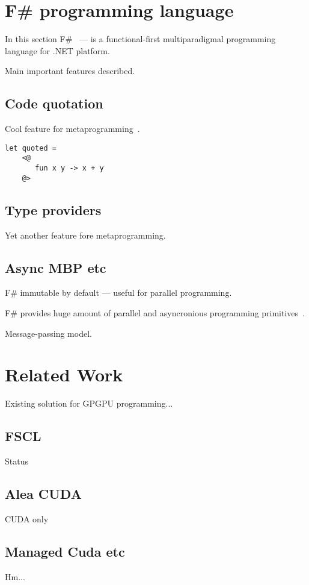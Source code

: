 \section{F\# programming language}

In this section F\#~\cite{fsharp} --- is a functional-first multiparadigmal programming language for .NET platform.

Main important features described.

\subsection{Code quotation}

Cool feature for metaprogramming~\cite{FSharpQuotations}.

\begin{lstlisting}[label=code_quotation_example,caption=Example of F\# code quotation]
let quoted = 
    <@
       fun x y -> x + y
    @>
\end{lstlisting}


\subsection{Type providers}

Yet another feature fore metaprogramming.

\subsection{Async MBP etc}

F\# immutable by default --- useful for parallel programming.

F\# provides huge amount of parallel and asyncronious programming primitives~\cite{FSharpAsync}.

Message-passing model.

\section{Related Work}

Existing solution for GPGPU programming...

\subsection{FSCL}

Status~\cite{FSCLPhD}

\subsection{Alea CUDA}

CUDA only~\cite{AleaGPU}

\subsection{Managed Cuda etc}

Hm...